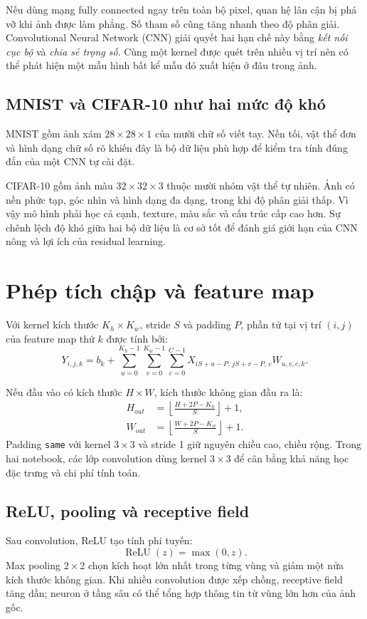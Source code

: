 \documentclass[12pt,a4paper]{report}
\begin{document}
Nếu dùng mạng fully connected ngay trên toàn bộ pixel, quan hệ lân cận bị phá vỡ khi ảnh được làm phẳng.
Số tham số cũng tăng nhanh theo độ phân giải.
Convolutional Neural Network (CNN) giải quyết hai hạn chế này bằng \textit{kết nối cục bộ} và \textit{chia sẻ trọng số}.
Cùng một kernel được quét trên nhiều vị trí nên có thể phát hiện một mẫu hình bất kể mẫu đó xuất hiện ở đâu trong ảnh.

\subsection{MNIST và CIFAR-10 như hai mức độ khó}
MNIST gồm ảnh xám $28\times28\times1$ của mười chữ số viết tay.
Nền tối, vật thể đơn và hình dạng chữ số rõ khiến đây là bộ dữ liệu phù hợp để kiểm tra tính đúng đắn của một CNN tự cài đặt.

CIFAR-10 gồm ảnh màu $32\times32\times3$ thuộc mười nhóm vật thể tự nhiên.
Ảnh có nền phức tạp, góc nhìn và hình dạng đa dạng, trong khi độ phân giải thấp.
Vì vậy mô hình phải học cả cạnh, texture, màu sắc và cấu trúc cấp cao hơn.
Sự chênh lệch độ khó giữa hai bộ dữ liệu là cơ sở tốt để đánh giá giới hạn của CNN nông và lợi ích của residual learning.

\section{Phép tích chập và feature map}
Với kernel kích thước $K_h\times K_w$, stride $S$ và padding $P$, phần tử tại vị trí $(i,j)$ của feature map thứ $k$ được tính bởi:
\begin{equation}
Y_{i,j,k}=b_k+
\sum_{u=0}^{K_h-1}
\sum_{v=0}^{K_w-1}
\sum_{c=0}^{C-1}
X_{iS+u-P,\,jS+v-P,\,c}W_{u,v,c,k}.
\end{equation}

Nếu đầu vào có kích thước $H\times W$, kích thước không gian đầu ra là:
\begin{align}
H_{out} &= \left\lfloor\frac{H+2P-K_h}{S}\right\rfloor+1,\\
W_{out} &= \left\lfloor\frac{W+2P-K_w}{S}\right\rfloor+1.
\end{align}
Padding \texttt{same} với kernel $3\times3$ và stride 1 giữ nguyên chiều cao, chiều rộng.
Trong hai notebook, các lớp convolution dùng kernel $3\times3$ để cân bằng khả năng học đặc trưng và chi phí tính toán.

\subsection{ReLU, pooling và receptive field}
Sau convolution, ReLU tạo tính phi tuyến:
\begin{equation}
    \operatorname{ReLU}(z)=\max(0,z).
\end{equation}
Max pooling $2\times2$ chọn kích hoạt lớn nhất trong từng vùng và giảm một nửa kích thước không gian.
Khi nhiều convolution được xếp chồng, receptive field tăng dần; neuron ở tầng sâu có thể tổng hợp thông tin từ vùng lớn hơn của ảnh gốc.
\end{document}
